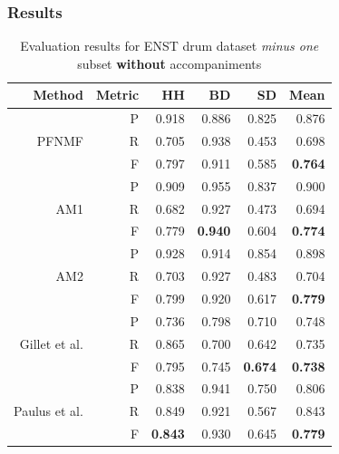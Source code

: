 \documentclass{article}
\begin{document}
\subsubsection{Results}\label{subsec:Evaluation}
\begin{table}[t]
\begin{footnotesize}
\centering
\begin{tabular*}{\textwidth}{@{\extracolsep{\stretch{1}}}*{6}{r}@{}}%
\hline
Method                         & Metric & HH             & BD             & SD             & Mean           \\ \hline
\multirow{3}{*}{PFNMF}         & P      & 0.918          & 0.886          & 0.825          & 0.876          \\
                               & R      & 0.705          & 0.938          & 0.453          & 0.698          \\
                               & F      & 0.797          & 0.911          & 0.585          & \textbf{0.764} \\ \hline
\multirow{3}{*}{AM1}       & P      & 0.909          & 0.955          & 0.837          & 0.900          \\
                               & R      & 0.682          & 0.927          & 0.473          & 0.694          \\
                               & F      & 0.779          & \textbf{0.940} & 0.604          & \textbf{0.774} \\ \hline
\multirow{3}{*}{AM2}       & P      & 0.928          & 0.914          & 0.854          & 0.898          \\
                               & R      & 0.703          & 0.927          & 0.483          & 0.704          \\
                               & F      & 0.799          & 0.920          & 0.617          & \textbf{0.779} \\ \hline
\multirow{3}{*}{Gillet et al.\cite{gillet_transcription_2008}} & P      & 0.736          & 0.798          & 0.710          & 0.748          \\
                               & R      & 0.865          & 0.700          & 0.642          & 0.735          \\
                               & F      & 0.795          & 0.745          & \textbf{0.674} & \textbf{0.738} \\ \hline
\multirow{3}{*}{Paulus et al.\cite{Paulus2009a}} & P      & 0.838          & 0.941          & 0.750          & 0.806          \\
                               & R      & 0.849          & 0.921          & 0.567          & 0.843          \\
                               & F      & \textbf{0.843} & 0.930          & 0.645          & \textbf{0.779} \\ \hline
\end{tabular*}
\end{footnotesize}
\caption{Evaluation results for ENST drum dataset \textit{minus one} subset \textbf{without} accompaniments}\label{results1}
\end{table}
\end{document}

